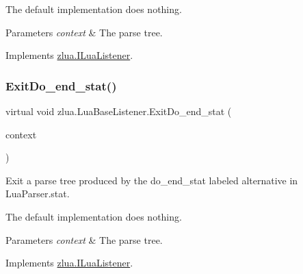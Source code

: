 The default implementation does nothing.


\begin{DoxyParams}{Parameters}
{\em context} & The parse tree.\\
\hline
\end{DoxyParams}


Implements \mbox{\hyperlink{interfacezlua_1_1_i_lua_listener_ae7d177d2d81dce7f3eca3f59aeef7732}{zlua.\+I\+Lua\+Listener}}.

\mbox{\label{classzlua_1_1_lua_base_listener_acc7bef5cd55b204e258816f477397304}} 
\subsubsection{\texorpdfstring{Exit\+Do\+\_\+end\+\_\+stat()}{ExitDo\_end\_stat()}}
{\footnotesize\ttfamily virtual void zlua.\+Lua\+Base\+Listener.\+Exit\+Do\+\_\+end\+\_\+stat (\begin{DoxyParamCaption}\item[{\mbox{[}\+Not\+Null\mbox{]} \mbox{\hyperlink{classzlua_1_1_lua_parser_1_1_do__end__stat_context}{Lua\+Parser.\+Do\+\_\+end\+\_\+stat\+Context}}}]{context }\end{DoxyParamCaption})\hspace{0.3cm}{\ttfamily [virtual]}}



Exit a parse tree produced by the {\ttfamily do\+\_\+end\+\_\+stat} labeled alternative in Lua\+Parser.\+stat. 

The default implementation does nothing.


\begin{DoxyParams}{Parameters}
{\em context} & The parse tree.\\
\hline
\end{DoxyParams}


Implements \mbox{\hyperlink{interfacezlua_1_1_i_lua_listener_a21222197a86ad5c425dcab38204a7840}{zlua.\+I\+Lua\+Listener}}.

\mbox{\label{classzlua_1_1_lua_base_listener_aa5d977c15c8fc410aa01cbff4372b873}} 
